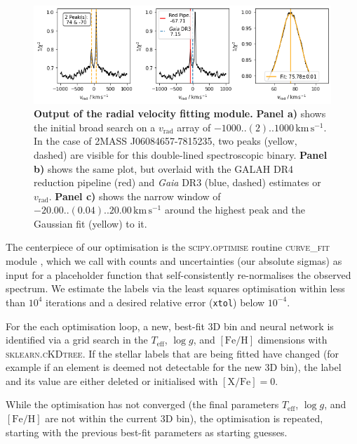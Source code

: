 \documentclass[
  journal=pasa,
  manuscript=research-paper, %
  year=2023,
  volume=37
]{cup-journal}
\newcommand{\Teff}{$T_\mathrm{eff}$\xspace}
\newcommand{\logg}{$\log g$\xspace}
\newcommand{\feh}{$\mathrm{[Fe/H]}$\xspace}
\newcommand{\vrad}{$v_\mathrm{rad}$\xspace}
\newcommand{\Gaia}{\textit{Gaia}\xspace}
\newcommand{\TLF}{\Teff, \logg, and \feh}
\newcommand{\kms}{\,\mathrm{km\,s^{-1}}}	%
\begin{document}
\begin{figure}[hbt]
\centering
\includegraphics[width=\textwidth]{figures/181221003101356_single_fit_rv.png}
\caption{\textbf{Output of the radial velocity fitting module.} \textbf{Panel a)} shows the initial broad search on a \vrad array of $-1000..(2)..1000\kms$. In the case of 2MASS J06084657-7815235, two peaks (yellow, dashed) are visible for this double-lined spectroscopic binary. \textbf{Panel b)} shows the same plot, but overlaid with the GALAH DR4 reduction pipeline (red) and \Gaia DR3 (blue, dashed) estimates or \vrad. \textbf{Panel c)} shows the narrow window of $-20.00..(0.04)..20.00\kms$ around the highest peak and the Gaussian fit (yellow) to it.}
\label{fig:181221003101356_single_fit_rv}
\end{figure}

The centerpiece of our optimisation is the \textsc{scipy.optimise} routine \textsc{curve\_fit} module \citep{scipy}, which we call with counts and uncertainties (our absolute sigmas) as input for a placeholder function that self-consistently re-normalises the observed spectrum. We estimate the labels via the least squares optimisation within less than $10^4$ iterations and a desired relative error (\texttt{xtol}) below $10^{-4}$.

For the each optimisation loop, a new, best-fit 3D bin and neural network is identified via a grid search in the \TLF dimensions with \textsc{sklearn.cKDtree}. If the stellar labels that are being fitted have changed (for example if an element is deemed not detectable for the new 3D bin), the label and its value are either deleted or initialised with $\mathrm{[X/Fe]} = 0$.

While the optimisation has not converged (the final parameters \TLF are not within the current 3D bin), the optimisation is repeated, starting with the previous best-fit parameters as starting guesses.
\end{document}
